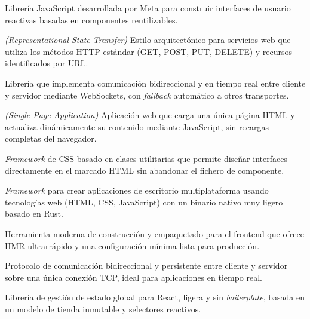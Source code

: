 \documentclass[a4paper]{report}
\begin{document}
\begin{description}[leftmargin=3.5cm, style=nextline]
  \item[\textbf{React}] Librería JavaScript desarrollada por Meta para construir interfaces de usuario reactivas basadas en componentes reutilizables.

  \item[\textbf{REST}] \textit{(Representational State Transfer)} Estilo arquitectónico para servicios web que utiliza los métodos HTTP estándar (GET, POST, PUT, DELETE) y recursos identificados por URL.

  \item[\textbf{Socket.io}] Librería que implementa comunicación bidireccional y en tiempo real entre cliente y servidor mediante WebSockets, con \textit{fallback} automático a otros transportes.

  \item[\textbf{SPA}] \textit{(Single Page Application)} Aplicación web que carga una única página HTML y actualiza dinámicamente su contenido mediante JavaScript, sin recargas completas del navegador.

  \item[\textbf{Tailwind CSS}] \textit{Framework} de CSS basado en clases utilitarias que permite diseñar interfaces directamente en el marcado HTML sin abandonar el fichero de componente.

  \item[\textbf{Tauri}] \textit{Framework} para crear aplicaciones de escritorio multiplataforma usando tecnologías web (HTML, CSS, JavaScript) con un binario nativo muy ligero basado en Rust.

  \item[\textbf{Vite}] Herramienta moderna de construcción y empaquetado para el frontend que ofrece HMR ultrarrápido y una configuración mínima lista para producción.

  \item[\textbf{WebSocket}] Protocolo de comunicación bidireccional y persistente entre cliente y servidor sobre una única conexión TCP, ideal para aplicaciones en tiempo real.

  \item[\textbf{Zustand}] Librería de gestión de estado global para React, ligera y sin \textit{boilerplate}, basada en un modelo de tienda inmutable y selectores reactivos.

\end{description}

\newpage

\end{document}

